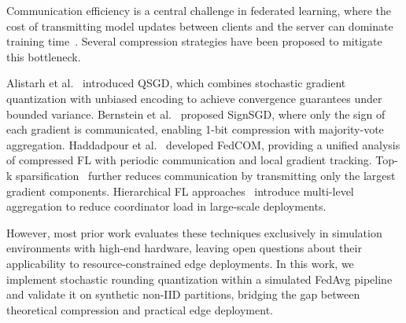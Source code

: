 
Communication efficiency is a central challenge in federated learning,
where the cost of transmitting model updates between clients and the server
can dominate training time~\cite{kairouz2021fl}. Several compression
strategies have been proposed to mitigate this bottleneck.

Alistarh et al.~\cite{alistarh2017qsgd} introduced QSGD, which combines
stochastic gradient quantization with unbiased encoding to achieve convergence
guarantees under bounded variance. Bernstein et al.~\cite{bernstein2018signsgd}
proposed SignSGD, where only the sign of each gradient is communicated,
enabling 1-bit compression with majority-vote aggregation. Haddadpour et
al.~\cite{haddadpour2021fedcom} developed FedCOM, providing a unified analysis
of compressed FL with periodic communication and local gradient tracking.
Top-k sparsification~\cite{aji2017topk} further reduces communication by
transmitting only the largest gradient components. Hierarchical FL
approaches~\cite{liu2020hierarchical,abad2020hierarchical} introduce
multi-level aggregation to reduce coordinator load in large-scale deployments.

However, most prior work evaluates these techniques exclusively in simulation
environments with high-end hardware, leaving open questions about their
applicability to resource-constrained edge deployments. In this work, we
implement stochastic rounding quantization within a simulated FedAvg pipeline
and validate it on synthetic non-IID partitions, bridging the gap between
theoretical compression and practical edge deployment.
